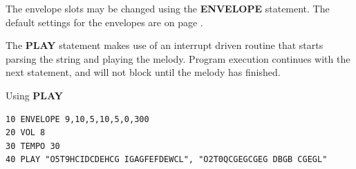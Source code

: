 \begin{description}[leftmargin=2cm,style=nextline]
The envelope slots may be changed using the {\bf ENVELOPE}
statement. The default settings for the envelopes are on
page \pageref{envelopetable}.

\item [Remarks:] The {\bf PLAY} statement makes use of an interrupt
                 driven routine that starts parsing the string
                 and playing the melody. Program execution continues
                 with the next statement, and will not block until
                 the melody has finished.


\item [Example:] Using {\bf PLAY}
\begin{tcolorbox}[colback=black,coltext=white]
\verbatimfont{\codefont}
\begin{verbatim}
10 ENVELOPE 9,10,5,10,5,0,300
20 VOL 8
30 TEMPO 30
40 PLAY "O5T9HCIDCDEHCG IGAGFEFDEWCL", "O2T0QCGEGCGEG DBGB CGEGL"
\end{verbatim}
\end{tcolorbox}
\end{description}


\newpage
